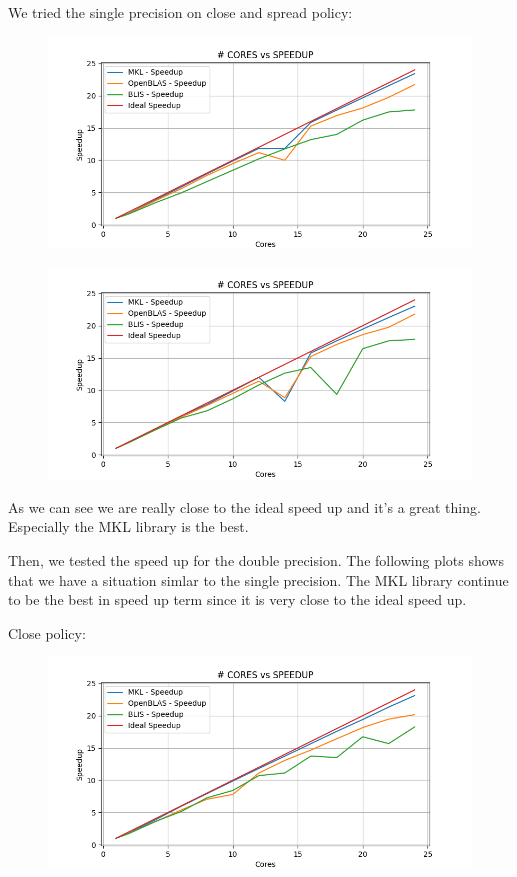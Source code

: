 \documentclass[12pt, titlepage]{report}
\begin{document}
We tried the single precision on close and spread policy: 
\begin{figure}[H]
    \centering
    \includegraphics[width=\textwidth]{THIN speedUp/sgemm_mkl.x_THIN_10000_close_detailed__speedUp.png}
\end{figure}

\begin{figure}[H]
    \centering
    \includegraphics[width=\textwidth]{THIN speedUp/sgemm_mkl.x_THIN_10000_spread_detailed__speedUp.png}
\end{figure}

As we can see we are really close to the ideal speed up and it's a great thing. Especially the MKL library is the best.

Then, we tested the speed up for the double precision. The following plots shows that we have a situation simlar to the single precision. The MKL library continue to be the best in speed up term since it is very close to the ideal speed up.

Close policy:
\begin{figure}[H]
    \centering
    \includegraphics[width=\textwidth]{THIN speedUp/dgemm_mkl.x_THIN_10000_close_detailed__speedUp.png}
\end{figure}
\end{document}
